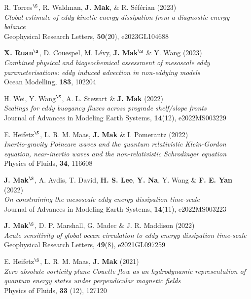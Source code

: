 \documentclass[letterpaper]{article}
\renewenvironment{itemize}{
  \begin{list}{}{
    \setlength{\leftmargin}{1.5em}
  }
}{
  \end{list}
}
\begin{document}
\begin{itemize}
\item[18.] R. Torres$^{\S}$, R. Waldman, \textbf{J. Mak}, \& R. S\'ef\'erian (2023)\\
\textit{Global estimate of eddy kinetic energy dissipation from a diagnostic energy balance}\\
Geophysical Research Letters, \textbf{50}(20), e2023GL104688

\item[17.] \textbf{X. Ruan}$^{\S}$, D. Couespel, M. L\'evy, \textbf{J. Mak}$^{\S}$ \& Y. Wang (2023)\\
\textit{Combined physical and biogeochemical assessment of mesoscale eddy parameterisations: eddy induced advection in non-eddying models}\\
Ocean Modelling, \textbf{183}, 102204

\item[16.] H. Wei, Y. Wang$^{\S}$, A. L. Stewart \& \textbf{J. Mak}
(2022)\\
\textit{Scalings for eddy buoyancy fluxes across prograde shelf/slope fronts}\\
Journal of Advances in Modeling Earth Systems, \textbf{14}(12), e2022MS003229

\item[15.] E. Heifetz$^{\S}$, L. R. M. Maas, \textbf{J. Mak} \& I. Pomerantz (2022)\\
\textit{Inertio-gravity Poincare waves and the quantum relativistic Klein-Gordon equation, near-inertio waves and the non-relativistic Schrodinger equation}\\
Physics of Fluids, \textbf{34}, 116608

\item[14.] \textbf{J. Mak}$^{\S}$, A. Avdis, T. David, \textbf{H. S. Lee}, \textbf{Y. Na}, Y. Wang \& \textbf{F. E. Yan} (2022)\\
\textit{On constraining the mesoscale eddy energy dissipation time-scale}\\
Journal of Advances in Modeling Earth Systems, \textbf{14}(11), e2022MS003223

\item[13.] \textbf{J. Mak}$^{\S}$, D. P. Marshall, G. Madec \& J. R. Maddison (2022)\\
\textit{Acute sensitivity of global ocean circulation to eddy energy dissipation time-scale}\\
Geophysical Research Letters, \textbf{49}(8), e2021GL097259

\item[12.] E. Heifetz$^{\S}$, L. R. M. Maas, \textbf{J. Mak} (2021)\\
\textit{Zero absolute vorticity plane Couette flow as an hydrodynamic representation of quantum energy states under perpendicular magnetic fields}\\
Physics of Fluids, \textbf{33} (12), 127120


\end{itemize}
\end{document}
